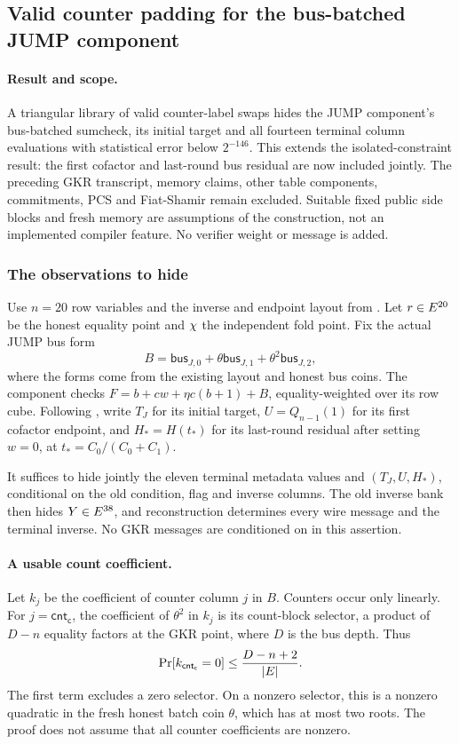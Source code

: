 \subsection{Valid counter padding for the bus-batched JUMP component}\label{note:zk-jump-bus-padding}

\paragraph{Result and scope.} A triangular library of valid counter-label swaps hides the JUMP component's bus-batched sumcheck, its initial target and all fourteen terminal column evaluations with statistical error below $2^{-146}$. This extends the isolated-constraint result: the first cofactor and last-round bus residual are now included jointly. The preceding GKR transcript, memory claims, other table components, commitments, PCS and Fiat-Shamir remain excluded. Suitable fixed public side blocks and fresh memory are assumptions of the construction, not an implemented compiler feature. No verifier weight or message is added.

\subsubsection{The observations to hide}

Use $n=20$ row variables and the inverse and endpoint layout from . Let $r\in E^{20}$ be the honest equality point and $\chi$ the independent fold point. Fix the actual JUMP bus form
\[
 B=\mathsf{bus}_{J,0}+\theta\mathsf{bus}_{J,1}
       +\theta^2\mathsf{bus}_{J,2},
\]
where the forms come from the existing layout and honest bus coins. The component checks $F=b+cw+\eta c(b+1)+B$, equality-weighted over its row cube. Following , write $T_J$ for its initial target, $U=Q_{n-1}(1)$ for its first cofactor endpoint, and $H_*=H(t_*)$ for its last-round residual after setting $w=0$, at $t_*=C_0/(C_0+C_1)$.

It suffices to hide jointly the eleven terminal metadata values and $(T_J,U,H_*)$, conditional on the old condition, flag and inverse columns. The old inverse bank then hides $Y\in E^{38}$, and reconstruction determines every wire message and the terminal inverse. No GKR messages are conditioned on in this assertion.

\paragraph{A usable count coefficient.} Let $k_j$ be the coefficient of counter column $j$ in $B$. Counters occur only linearly. For $j=\mathsf{cnt_c}$, the coefficient of $\theta^2$ in $k_j$ is its count-block selector, a product of $D-n$ equality factors at the GKR point, where $D$ is the bus depth. Thus
\[
 \Pr[k_{\mathsf{cnt_c}}=0]\le\frac{D-n+2}{|E|}.
\]
The first term excludes a zero selector. On a nonzero selector, this is a nonzero quadratic in the fresh honest batch coin $\theta$, which has at most two roots. The proof does not assume that all counter coefficients are nonzero.

